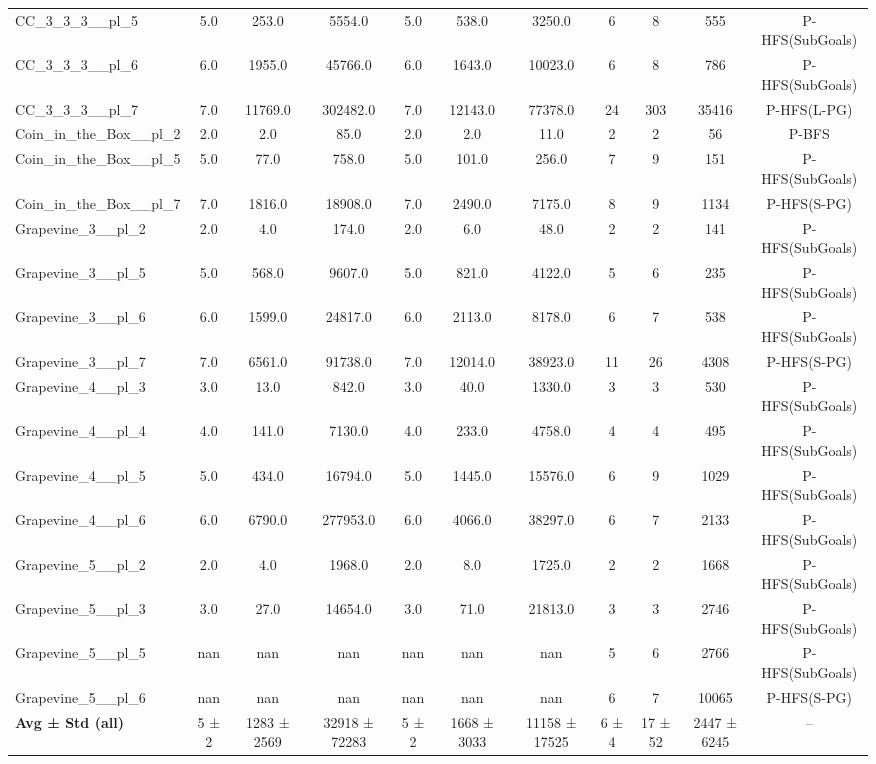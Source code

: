 \begin{table}[!ht]
\begin{tabular}{l|ccc|ccc|cccc}
CC\_3\_3\_3\_\_pl\_5 & 5.0 & 253.0 & 5554.0 & 5.0 & 538.0 & 3250.0 & 6 & 8 & 555 & P-HFS(SubGoals) \\
CC\_3\_3\_3\_\_pl\_6 & 6.0 & 1955.0 & 45766.0 & 6.0 & 1643.0 & 10023.0 & 6 & 8 & 786 & P-HFS(SubGoals) \\
CC\_3\_3\_3\_\_pl\_7 & 7.0 & 11769.0 & 302482.0 & 7.0 & 12143.0 & 77378.0 & 24 & 303 & 35416 & P-HFS(L-PG) \\
Coin\_in\_the\_Box\_\_pl\_2 & 2.0 & 2.0 & 85.0 & 2.0 & 2.0 & 11.0 & 2 & 2 & 56 & P-BFS \\
Coin\_in\_the\_Box\_\_pl\_5 & 5.0 & 77.0 & 758.0 & 5.0 & 101.0 & 256.0 & 7 & 9 & 151 & P-HFS(SubGoals) \\
Coin\_in\_the\_Box\_\_pl\_7 & 7.0 & 1816.0 & 18908.0 & 7.0 & 2490.0 & 7175.0 & 8 & 9 & 1134 & P-HFS(S-PG) \\
Grapevine\_3\_\_pl\_2 & 2.0 & 4.0 & 174.0 & 2.0 & 6.0 & 48.0 & 2 & 2 & 141 & P-HFS(SubGoals) \\
Grapevine\_3\_\_pl\_5 & 5.0 & 568.0 & 9607.0 & 5.0 & 821.0 & 4122.0 & 5 & 6 & 235 & P-HFS(SubGoals) \\
Grapevine\_3\_\_pl\_6 & 6.0 & 1599.0 & 24817.0 & 6.0 & 2113.0 & 8178.0 & 6 & 7 & 538 & P-HFS(SubGoals) \\
Grapevine\_3\_\_pl\_7 & 7.0 & 6561.0 & 91738.0 & 7.0 & 12014.0 & 38923.0 & 11 & 26 & 4308 & P-HFS(S-PG) \\
Grapevine\_4\_\_pl\_3 & 3.0 & 13.0 & 842.0 & 3.0 & 40.0 & 1330.0 & 3 & 3 & 530 & P-HFS(SubGoals) \\
Grapevine\_4\_\_pl\_4 & 4.0 & 141.0 & 7130.0 & 4.0 & 233.0 & 4758.0 & 4 & 4 & 495 & P-HFS(SubGoals) \\
Grapevine\_4\_\_pl\_5 & 5.0 & 434.0 & 16794.0 & 5.0 & 1445.0 & 15576.0 & 6 & 9 & 1029 & P-HFS(SubGoals) \\
Grapevine\_4\_\_pl\_6 & 6.0 & 6790.0 & 277953.0 & 6.0 & 4066.0 & 38297.0 & 6 & 7 & 2133 & P-HFS(SubGoals) \\
Grapevine\_5\_\_pl\_2 & 2.0 & 4.0 & 1968.0 & 2.0 & 8.0 & 1725.0 & 2 & 2 & 1668 & P-HFS(SubGoals) \\
Grapevine\_5\_\_pl\_3 & 3.0 & 27.0 & 14654.0 & 3.0 & 71.0 & 21813.0 & 3 & 3 & 2746 & P-HFS(SubGoals) \\
Grapevine\_5\_\_pl\_5 & nan & nan & nan & nan & nan & nan & 5 & 6 & 2766 & P-HFS(SubGoals) \\
Grapevine\_5\_\_pl\_6 & nan & nan & nan & nan & nan & nan & 6 & 7 & 10065 & P-HFS(S-PG) \\
\hline
\textbf{Avg ± Std (all)} & 5 ± 2 & 1283 ± 2569 & 32918 ± 72283 & 5 ± 2 & 1668 ± 3033 & 11158 ± 17525 & 6 ± 4 & 17 ± 52 & 2447 ± 6245 & -- \\

\end{tabular}
\end{table}
